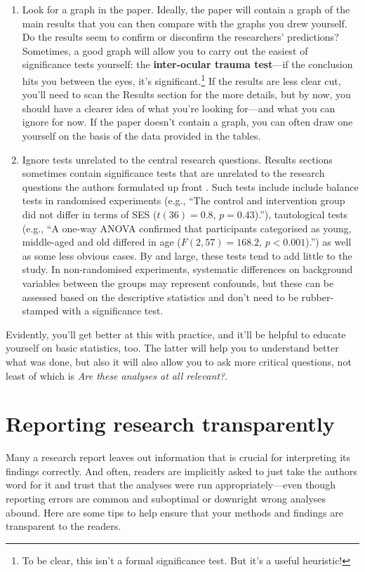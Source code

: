 \documentclass[a4paper]{tufte-book}\usepackage[]{graphicx}\usepackage[]{xcolor}
\newcommand{\term}[1]{\textbf{#1}}
\begin{document}
\begin{enumerate}
  \item Look for a graph in the paper.
Ideally, the paper will contain a graph of the main results 
that you can then compare with the graphs you drew yourself. 
Do the results seem to confirm or disconfirm the researchers' predictions? 
Sometimes, a good graph will allow you to carry out the easiest of significance tests yourself: 
the \term{inter-ocular trauma test}---if the conclusion hits you between the eyes, it's significant.\footnote{To be clear, this isn't a formal significance test. But it's a useful heuristic!} 
If the results are less clear cut, you'll need to scan the Results section 
for the more details, but by now, you should have a clearer idea of what you're 
looking for---and what you can ignore for now. If the paper doesn't contain a 
graph, you can often draw one yourself on the basis of the data provided in the tables.

\item Ignore tests unrelated to the central research questions.
Results sections sometimes contain significance tests that are unrelated to the 
research questions the authors formulated up front \citep[see][]{Vanhove2020b}. 
Such tests include include balance tests in randomised experiments 
(e.g., ``The control and intervention group did not differ in terms of SES 
($t(36) = 0.8$, $p = 0.43$).''), tautological tests (e.g., 
``A one-way ANOVA confirmed that participants categorised as young, 
middle-aged and old differed in age ($F(2, 57) = 168.2$, $p < 0.001$).'') 
as well as some less obvious cases. By and large, these tests tend to add 
little to the study. In non-randomised experiments, systematic differences 
on background variables between the groups may represent confounds, but these 
can be assessed based on the descriptive statistics and don't need to be 
rubber-stamped with a significance test.
\end{enumerate}

Evidently, you'll get better at this with practice,
and it'll be helpful to educate yourself on basic statistics, too.
The latter will help you to understand better what was done,
but also it will also allow you to ask more critical questions, not
least of which is \textit{Are these analyses at all relevant?}.


\chapter{Reporting research transparently}

Many a research report leaves out information that is crucial
for interpreting its findings correctly. And often, readers are
implicitly asked to just take the authors word for it and trust that the
analyses were run appropriately---even though reporting errors are common
\citep{Nuijten2016} and suboptimal or downright wrong analyses
abound.
Here are some tips to help ensure that your methods and
findings are transparent to the readers.
\end{document}
